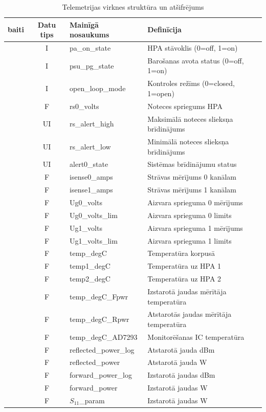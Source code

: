 \begin{table}[H]
\centering
\captionsetup{singlelinecheck=off, justification=raggedleft}
\caption{Telemetrijas virknes struktūra un atšifrējums}
\renewcommand{\arraystretch}{1.2}
\begin{tabular}{|c|c|l|l|}
\hline
\multirow{24}{*}{\centering 96 baiti} & \textbf{Datu tips} & \textbf{Mainīgā nosaukums} & \textbf{Definīcija} \\
\hline
\cline{2-4}
& I    & pa\_on\_state          & HPA stāvoklis (0=off, 1=on) \\
\cline{2-4}
& I    & psu\_pg\_state         & Barošanas avota status (0=off, 1=on) \\
\cline{2-4}
& I    & open\_loop\_mode       & Kontroles režīms (0=closed, 1=open) \\
\cline{2-4}
& F    & rs0\_volts            & Noteces spriegums HPA \\
\cline{2-4}
& UI   & rs\_alert\_high       & Maksimālā noteces slieksņa brīdinājums\\
\cline{2-4}
& UI   & rs\_alert\_low        & Minimālā noteces slieksņa brīdinājums\\
\cline{2-4}
& UI   & alert0\_state         & Sistēmas brīdinājumu status \\
\cline{2-4}
& F    & isense0\_amps         & Strāvas mērījums 0 kanālam\\
\cline{2-4}
& F    & isense1\_amps         & Strāvas mērījums 1 kanālam\\
\cline{2-4}
& F    & Ug0\_volts            & Aizvara sprieguma 0 mērījums \\
\cline{2-4}
& F    & Ug0\_volts\_lim       & Aizvara sprieguma 0 limits \\
\cline{2-4}
& F    & Ug1\_volts            & Aizvara sprieguma 1 mērījums \\
\cline{2-4}
& F    & Ug1\_volts\_lim       & Aizvara sprieguma 1 limits \\
\cline{2-4}
& F    & temp\_degC            & Temperatūra korpusā \\
\cline{2-4}
& F    & temp1\_degC           & Temperatūra uz HPA 1 \\
\cline{2-4}
& F    & temp2\_degC           & Temperatūra uz HPA 2 \\
\cline{2-4}
& F    & temp\_degC\_Fpwr      & Izstarotā jaudas mērītāja temperatūra \\
\cline{2-4}
& F    & temp\_degC\_Rpwr      & Atstarotās jaudas mērītāja temperatūra\\
\cline{2-4}
& F    & temp\_degC\_AD7293      & Monitorēšanas IC temperatūra\\
\cline{2-4}
& F    & reflected\_power\_log      & Atstarotā jauda dBm \\
\cline{2-4}
& F    & reflected\_power\      & Atstarotā jauda W\\
\cline{2-4}
& F    & forward\_power\_log        & Izstarotā jaudas dBm \\
\cline{2-4}
& F    & forward\_power\        & Izstarotā jaudas W \\
\cline{2-4}
& F    & $S_{11}$\_param\        & Izstarotā jaudas W \\
\hline
\end{tabular}
\end{table}
